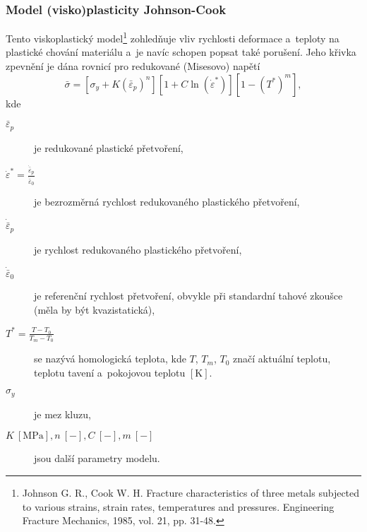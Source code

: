 \subsubsection{Model (visko)plasticity Johnson-Cook}\label{sec:johnson-cook-viskoplasticita}
Tento viskoplastický model\footnote{Johnson G. R., Cook W. H. Fracture characteristics of three metals subjected to various strains, strain rates, temperatures and pressures. Engineering Fracture Mechanics, 1985, vol. 21, pp. 31-48.} zohledňuje vliv rychlosti deformace a~teploty na plastické chování materiálu a~je navíc schopen popsat také porušení.
Jeho křivka zpevnění je dána rovnicí pro redukované (Misesovo) napětí
\begin{equation}
	\bar{\sigma} = \left[ \sigma_y + K (\bar{\varepsilon}_p)^n \right] \left[ 1 + C \ln(\dot{\varepsilon}^*) \right] \left[ 1 - (T^*)^m \right],
\end{equation}
kde
\begin{description}
	\item[$\bar{\varepsilon}_p$] je redukované plastické přetvoření,  
	\item[$\dot{\varepsilon}^* = \tfrac{\dot{\bar{\varepsilon}}_p}{\dot{\bar{\varepsilon}}_0}$] je bezrozměrná rychlost redukovaného plastického přetvoření,
	\item[$\dot{\bar{\varepsilon}}_p$] je rychlost redukovaného plastického přetvoření,
	\item[$\dot{\bar{\varepsilon}}_0$] je referenční rychlost přetvoření, obvykle při standardní tahové zkoušce (měla by být kvazistatická),
	\item[$T^* = \tfrac{T-T_0}{T_m-T_0}$] se nazývá homologická teplota, kde 
	$T$, $T_m$, $T_0$ značí aktuální teplotu, teplotu tavení a~pokojovou teplotu $[\si{\kelvin}]$.
	\item[$\sigma_y$] je mez kluzu,
	\item[{$K\:[\si{\mega\pascal}], n\:[-], C\:[-], m\:[-]$}] jsou další parametry modelu.
\end{description}

